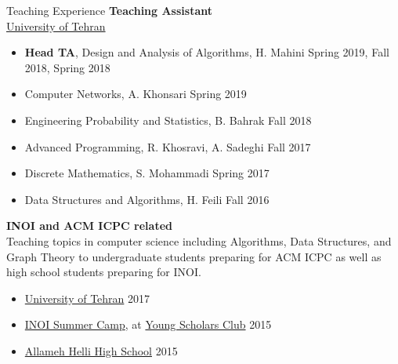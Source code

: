 \documentclass{resume} %
\begin{document}

\begin{rSection}{Teaching Experience}
	{\bf Teaching Assistant}
	\\\href{http://ut.ac.ir/en}{University of Tehran}
	\begin{itemize}
		\item {\bf Head TA}, Design and Analysis of Algorithms, H. Mahini \hfill Spring 2019, Fall 2018, Spring 2018
		\item Computer Networks, A. Khonsari \hfill Spring 2019
		\item Engineering Probability and Statistics, B. Bahrak \hfill Fall 2018
		\item Advanced Programming, R. Khosravi, A. Sadeghi \hfill Fall 2017
		\item Discrete Mathematics, S. Mohammadi \hfill Spring 2017
		\item Data Structures and Algorithms, H. Feili \hfill Fall 2016
	\end{itemize}
	
	{\bf INOI and ACM ICPC related}
	\\Teaching topics in computer science including Algorithms, Data Structures,
	and Graph Theory to undergraduate students preparing for ACM ICPC as well as high school
	students preparing for INOI.
	\begin{itemize}
		\item \href{http://ut.ac.ir/en}{University of Tehran} \hfill 2017
		\item \href{http://inoi.ir/}{INOI Summer Camp}, at \href{http://ysc.ac.ir/}{Young Scholars Club} \hfill 2015
		\item \href{http://www.helli.ir/}{Allameh Helli High School} \hfill 2015
	\end{itemize}
\end{rSection}
\end{document}
